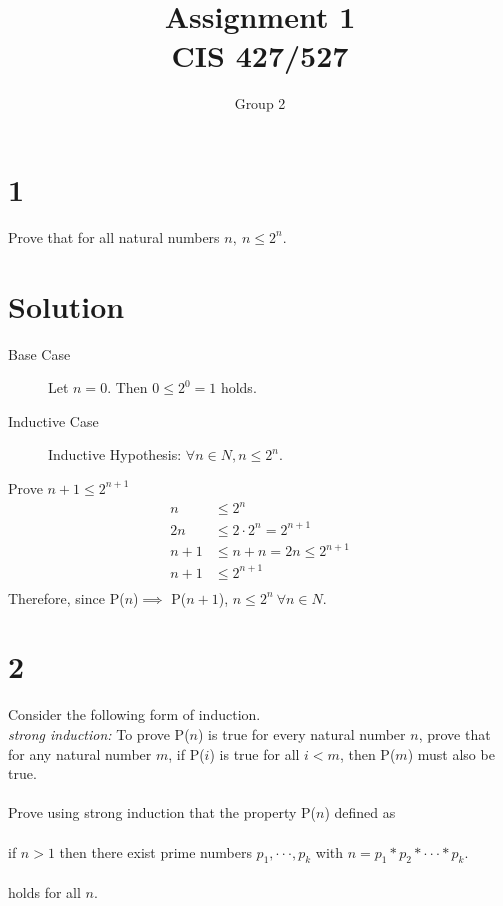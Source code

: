 \documentclass{article}
\begin{document}
\title{Assignment \raisebox{.22ex}{\large\#}1 \\
	CIS 427/527}
\author{Group 2}

\maketitle


\section*{1}
Prove that for all natural numbers $n,\ n\leq 2^n$. 

\section*{Solution}

\begin{description}
\item[Base Case] Let $n=0$. Then $0 \leq 2^0 = 1$ holds.  
\item[Inductive Case] Inductive Hypothesis: $\forall n \in N, n \leq 2^n$.
\end{description}
\hspace{8em}Prove $n+1\leq 2^{n+1}$
\begin{align*}
n &\leq 2^n \\
2 n &\leq 2\cdot 2^n = 2^{n+1} \\
n + 1 &\leq n + n = 2n \leq 2^{n+1} \\
n + 1 &\leq 2^{n+1} \\
\end{align*}
Therefore, since P($n$)$\implies$ P($n+1$), $n\leq 2^n\ \forall n \in N$.


\section*{2}
Consider the following form of induction.\\
\textit{strong induction:} To prove P($n$) is true for every natural number $n$, prove that for any natural number $m$, if P($i$) is true for all $i<m$, then P($m$) must also be true.\\\\
Prove using strong induction that the property P($n$) defined as\\\\
\hspace*{2em}if $n>1$ then there exist prime numbers $p_1,\cdot \cdot \cdot , p_k$ with $n = p_1 * p_2 * \cdot \cdot \cdot * p_k$.\\\\
holds for all $n$.
\end{document}
